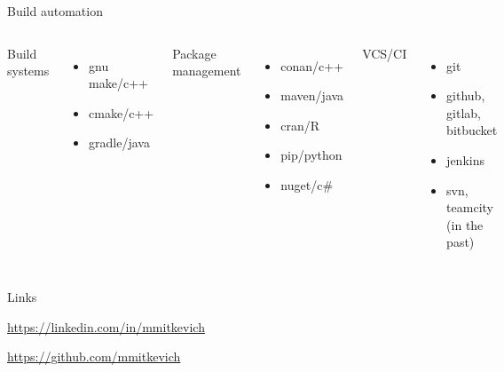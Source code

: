 \documentclass[10pt]{beamer}
\begin{document}
\begin{frame}{Build automation}
\begin{columns}[T,onlytextwidth]
	Build systems 
	\begin{itemize}
		\item gnu make/c++
		\item cmake/c++
		\item gradle/java
	\end{itemize}	
	Package management
	\begin{itemize}
		\item conan/c++
		\item maven/java
		\item cran/R
		\item pip/python
		\item nuget/c\#
	\end{itemize}
	
	VCS/CI
	\begin{itemize}
		\item git
		\item github, gitlab, bitbucket
		\item jenkins
		\item svn, teamcity (in the past)
	\end{itemize}
\end{columns}
\end{frame}

\begin{frame}{Links}

 	 \begin{center}\href{https://linkedin.com/in/mmitkevich}{https://linkedin.com/in/mmitkevich}\end{center}
 	 \begin{center}\href{https://github.com/mmitkevich}{https://github.com/mmitkevich}\end{center}

\end{frame}
\end{document}
